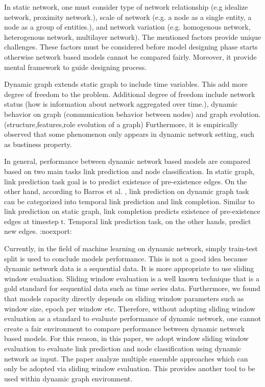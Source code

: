 \documentclass{IEEEtran}
\begin{document}
In static network, one must consider type of network relationship (e.g idealize network, proximity network.), scale of network (e.g. a node as a single entity, a node as a group of entities.), and network variation (e.g. homogenous network, heterogenous network, multilayer network). The mentioned factors provide unique challenges. These factors must be considered before model designing phase starts otherwise network based models cannot be compared fairly. Moreover, it provide mental framework to guide designing process.

Dynamic graph extends static graph to include time variables. This add more degree of freedom to the problem. Additional degree of freedom include network status (how is information about network aggregated over time.), dynamic behavior on graph (communication behavior between nodes) and graph evolution. (structure,features,role evolution of a graph) Furthermore, it is empirically observed that some phenomenon only appears in dynamic network setting, such as bustiness property.

In general, performance between dynamic network based models are compared based on two main tasks link prediction and node classification. In static graph, link prediction task goal is to predict existence of pre-existence edges. On the other hand, according to Barros et al.  \cite{barrosSurveyEmbeddingDynamic2021}, link prediction on dynamic graph task can be categorized into temporal link prediction and link completion. Similar to link prediction on static graph, link completion predicts existence of pre-existence edges at timestep t. Temporal link prediction task, on the other hands, predict new edges. :noexport:

Currently, in the field of machine learning on dynamic network, simply train-test split is used to conclude models performance. This is not a good idea because dynamic network data is a sequential data. It is more appropriate to use sliding window evaluation. Sliding window evaluation is a well known technique that is a gold standard for sequential data such as time series data. Furthermore, we found that models capacity directly depends on sliding window parameters such as window size, epoch per window etc. Therefore, without adopting sliding window evaluation as a standard to evaluate performance of dynamic network, one cannot create a fair environment to compare performance between dynamic network based models.
For this reason, in this paper, we adopt window sliding window evaluation to evaluate link prediction and node classification using dynamic network as input.
The paper analyze multiple ensemble approaches which can only be adopted via sliding window evaluation. This provides another tool to be used within dynamic graph environment.
\end{document}
